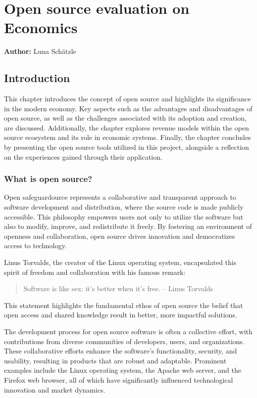 \chapter{Open source evaluation on Economics}
\label{cha:Open_source_evaluation_Economics}
\textbf{Author:} Luna Schätzle

\section{Introduction}

This chapter introduces the concept of open source and highlights its significance in the modern economy. 
Key aspects such as the advantages and disadvantages of open source, as well as the challenges associated with its adoption and creation, are discussed. 
Additionally, the chapter explores revenue models within the open source ecosystem and its role in economic systems. 
Finally, the chapter concludes by presenting the open source tools utilized in this project, alongside a reflection on the experiences gained through their application.


\subsection{What is open source?}

Open safeguardource represents a collaborative and transparent approach to software development and distribution, 
where the source code is made publicly accessible. This philosophy empowers users not only to utilize the software but also to modify, 
improve, and redistribute it freely. By fostering an environment of openness and collaboration, 
open source drives innovation and democratizes access to technology.

Linus Torvalds, the creator of the Linux operating system, encapsulated this spirit of freedom and collaboration with his famous remark:
\begin{quote}
    Software is like sex: it's better when it's free.
    -- Linus Torvalds    
\end{quote}

\cite{linus_torvalds_qoute}

This statement highlights the fundamental ethos of open source the belief that open access and shared knowledge result in better, more impactful solutions.


The development process for open source software is often a collective effort, 
with contributions from diverse communities of developers, users, and organizations. 
These collaborative efforts enhance the software's functionality, security, and usability, 
resulting in products that are robust and adaptable. Prominent examples include the Linux operating system, 
the Apache web server, and the Firefox web browser, all of which have significantly influenced technological innovation and market dynamics.

